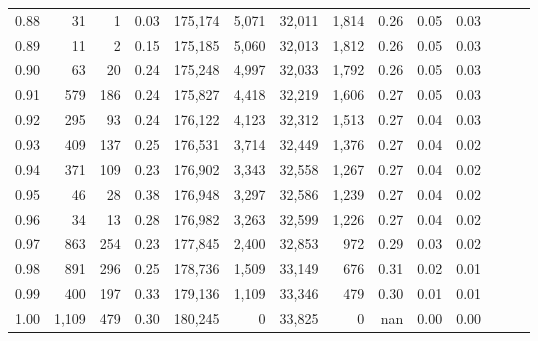 \begin{tabular}{rrrrrrrrrrrrrr}
0.88 &      31 &      1 &  0.03 &  175,174 &    5,071 &  32,011 &   1,814 &  0.26 &  0.05 &      0.03 \\
0.89 &      11 &      2 &  0.15 &  175,185 &    5,060 &  32,013 &   1,812 &  0.26 &  0.05 &      0.03 \\
0.90 &      63 &     20 &  0.24 &  175,248 &    4,997 &  32,033 &   1,792 &  0.26 &  0.05 &      0.03 \\
0.91 &     579 &    186 &  0.24 &  175,827 &    4,418 &  32,219 &   1,606 &  0.27 &  0.05 &      0.03 \\
0.92 &     295 &     93 &  0.24 &  176,122 &    4,123 &  32,312 &   1,513 &  0.27 &  0.04 &      0.03 \\
0.93 &     409 &    137 &  0.25 &  176,531 &    3,714 &  32,449 &   1,376 &  0.27 &  0.04 &      0.02 \\
0.94 &     371 &    109 &  0.23 &  176,902 &    3,343 &  32,558 &   1,267 &  0.27 &  0.04 &      0.02 \\
0.95 &      46 &     28 &  0.38 &  176,948 &    3,297 &  32,586 &   1,239 &  0.27 &  0.04 &      0.02 \\
0.96 &      34 &     13 &  0.28 &  176,982 &    3,263 &  32,599 &   1,226 &  0.27 &  0.04 &      0.02 \\
0.97 &     863 &    254 &  0.23 &  177,845 &    2,400 &  32,853 &     972 &  0.29 &  0.03 &      0.02 \\
0.98 &     891 &    296 &  0.25 &  178,736 &    1,509 &  33,149 &     676 &  0.31 &  0.02 &      0.01 \\
0.99 &     400 &    197 &  0.33 &  179,136 &    1,109 &  33,346 &     479 &  0.30 &  0.01 &      0.01 \\
1.00 &   1,109 &    479 &  0.30 &  180,245 &        0 &  33,825 &       0 &   nan &  0.00 &      0.00 \\
\bottomrule
\end{tabular}
